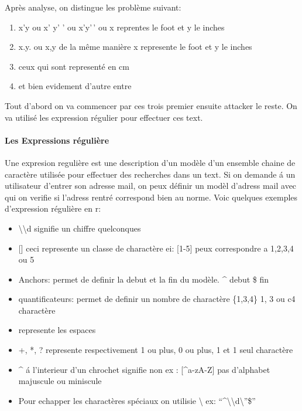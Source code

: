 \documentclass[
]{article}
\providecommand{\tightlist}{%
  \setlength{\itemsep}{0pt}\setlength{\parskip}{0pt}}
\begin{document}
Après analyse, on distingue les problème suivant:

\begin{enumerate}
\def\labelenumi{\arabic{enumi}.}
\tightlist
\item
  x'y ou x' y' ' ou x'y'\,' ou x reprentes le foot et y le inches
\item
  x.y. ou x,y de la même manière x represente le foot et y le inches
\item
  ceux qui sont representé en cm
\item
  et bien evidement d'autre entre
\end{enumerate}

Tout d'abord on va commencer par ces trois premier ensuite attacker le
reste. On va utilisé les expression régulier pour effectuer ces text.

\hypertarget{les-expressions-ruxe9guliuxe8re}{%
\paragraph{Les Expressions
régulière}\label{les-expressions-ruxe9guliuxe8re}}

Une expresion regulière est une description d'un modèle d'un ensemble
chaine de caractère utilisée pour effectuer des recherches dans un text.
Si on demande á un utilisateur d'entrer son adresse mail, on peux
définir un modèl d'adress mail avec qui on verifie si l'adress rentré
correspond bien au norme. Voic quelques exemples d'expression régulière
en r:

\begin{itemize}
\item
  \textbackslash\textbackslash d signifie un chiffre quelconques
\item
  {[}{]} ceci represente un classe de charactère ei: {[}1-5{]} peux
  correspondre a 1,2,3,4 ou 5
\item
  Anchors: permet de definir la debut et la fin du modèle. \^{} debut \$
  fin
\item
  quantificateurs: permet de definir un nombre de charactère \{1,3,4\}
  1, 3 ou c4 charactère
\item
  \s represente les espaces
\item
  +, *, ? represente respectivement 1 ou plus, 0 ou plus, 1 et 1 seul
  charactère
\item
  \^{} á l'interieur d'un chrochet signifie non ex : {[}\^{}a-zA-Z{]}
  pas d'alphabet majuscule ou miniscule
\item
  Pour echapper les charactères spéciaux on utilisie \textbackslash{}
  ex: ``\^{}\textbackslash\textbackslash d\textbackslash{}''\$''
\end{itemize}
\end{document}
